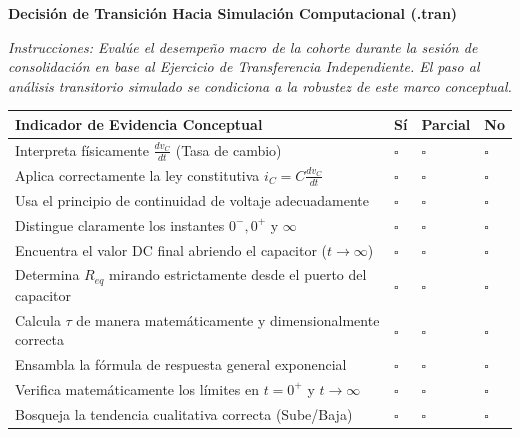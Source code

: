 \documentclass[11pt, a4paper]{article}
\begin{document}
\begin{tcolorbox}[colback=ucbblue!5!white, colframe=ucbblue, title=\textbf{Checklist Formativo de Progreso Docente (Readiness Gate)}]
    \centering \textbf{Decisión de Transición Hacia Simulación Computacional (.tran)}
\end{tcolorbox}

\noindent \textit{Instrucciones: Evalúe el desempeño macro de la cohorte durante la sesión de consolidación en base al Ejercicio de Transferencia Independiente. El paso al análisis transitorio simulado se condiciona a la robustez de este marco conceptual.}

\vspace{0.4cm}
\renewcommand{\arraystretch}{1.6}
\noindent
\begin{tabularx}{\textwidth}{>{\RaggedRight\arraybackslash}X >{\centering\arraybackslash}p{2cm} >{\centering\arraybackslash}p{2cm} >{\centering\arraybackslash}p{2cm}}
\toprule
\textbf{Indicador de Evidencia Conceptual} & \textbf{Sí} & \textbf{Parcial} & \textbf{No} \\ 
\midrule
Interpreta físicamente $\frac{dv_C}{dt}$ (Tasa de cambio) & $\square$ & $\square$ & $\square$ \\ \addlinespace
Aplica correctamente la ley constitutiva $i_C = C \frac{dv_C}{dt}$ & $\square$ & $\square$ & $\square$ \\ \addlinespace
Usa el principio de continuidad de voltaje adecuadamente & $\square$ & $\square$ & $\square$ \\ \addlinespace
Distingue claramente los instantes $0^-, 0^+$ y $\infty$ & $\square$ & $\square$ & $\square$ \\ \addlinespace
Encuentra el valor DC final abriendo el capacitor ($t \to \infty$) & $\square$ & $\square$ & $\square$ \\ \addlinespace
Determina $R_{eq}$ mirando estrictamente desde el puerto del capacitor & $\square$ & $\square$ & $\square$ \\ \addlinespace
Calcula $\tau$ de manera matemáticamente y dimensionalmente correcta & $\square$ & $\square$ & $\square$ \\ \addlinespace
Ensambla la fórmula de respuesta general exponencial & $\square$ & $\square$ & $\square$ \\ \addlinespace
Verifica matemáticamente los límites en $t=0^+$ y $t \to \infty$ & $\square$ & $\square$ & $\square$ \\ \addlinespace
Bosqueja la tendencia cualitativa correcta (Sube/Baja) & $\square$ & $\square$ & $\square$ \\ 
\bottomrule
\end{tabularx}
\end{document}

